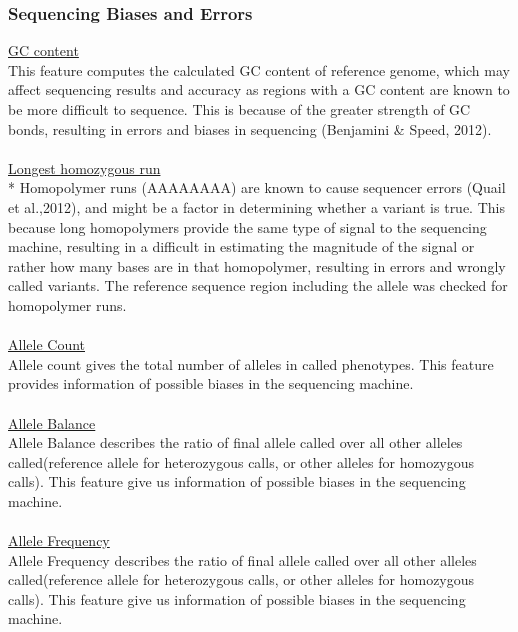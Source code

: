 \documentclass{article}
\begin{document}
\subsubsection{Sequencing Biases and Errors}
\underline{GC content}\\
This feature computes the calculated GC content of reference genome, which may affect sequencing results and accuracy as regions with a GC content are known to be more difficult to sequence. This is because of the greater strength of GC bonds, resulting in errors and biases in sequencing (Benjamini \& Speed, 2012).\\\\ 
\underline{Longest homozygous run}\\*
Homopolymer runs (AAAAAAAA) are known to cause sequencer errors (Quail et al.,2012), and might be a factor in determining whether a variant is true. This because long homopolymers provide the same type of signal to the sequencing machine, resulting in a difficult in estimating the magnitude of the signal or rather how many bases are in that homopolymer, resulting in errors and wrongly called variants. The reference sequence region including the allele was checked for homopolymer runs. \\\\
\underline{Allele Count}\\
Allele count gives the total number of alleles in called phenotypes. This feature provides information of possible biases in the sequencing machine.\\\\
\underline{Allele Balance}\\
Allele Balance describes the ratio of final allele called over all other alleles called(reference allele for heterozygous calls, or other alleles for homozygous calls). This feature give us information of possible biases in the sequencing machine. \\\\
\underline{Allele Frequency}\\
Allele Frequency describes the ratio of final allele called over all other alleles called(reference allele for heterozygous calls, or other alleles for homozygous calls). This feature give us information of possible biases in the sequencing machine. \\\\
\end{document}

